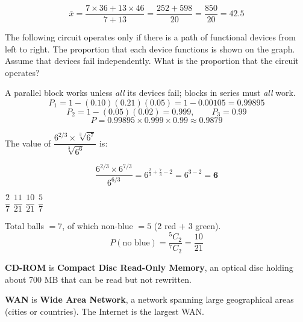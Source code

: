 \[\bar x=\frac{7\times36+13\times46}{7+13}=\frac{252+598}{20}=\frac{850}{20}=\mathbf{42.5}\]

The following circuit operates only if there is a path of functional devices from left to right. The proportion that each device functions is shown on the graph. Assume that devices fail independently. What is the proportion that the circuit operates?


A parallel block works unless \emph{all} its devices fail; blocks in series must \emph{all} work.
\[P_1=1-(0.10)(0.21)(0.05)=1-0.00105=0.99895\]
\[P_2=1-(0.05)(0.02)=0.999,\qquad P_3=0.99\]
\[P=0.99895\times0.999\times0.99\approx\mathbf{0.9879}\]

The value of $\dfrac{6^{2/3}\times\sqrt[3]{6^7}}{\sqrt[3]{6^6}}$ is:

\[\frac{6^{2/3}\times6^{7/3}}{6^{6/3}}=6^{\frac23+\frac73-2}=6^{3-2}=\mathbf{6}\]

$\dfrac27$
$\dfrac{11}{21}$
$\dfrac{10}{21}$
$\dfrac57$

Total balls $=7$, of which non-blue $=5$ (2 red $+$ 3 green).
\[P(\text{no blue})=\frac{{}^5C_2}{{}^7C_2}=\frac{10}{21}\]

\textbf{CD-ROM} is \textbf{Compact Disc Read-Only Memory}, an optical disc holding about 700 MB that can be read but not rewritten.

\textbf{WAN} is \textbf{Wide Area Network}, a network spanning large geographical areas (cities or countries). The Internet is the largest WAN.


